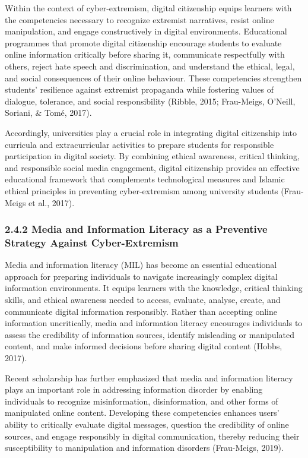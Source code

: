 \documentclass[10pt]{NSP1}
\begin{document}
	Within the context of cyber-extremism, digital citizenship equips learners with the competencies necessary to recognize extremist narratives, resist online manipulation, and engage constructively in digital environments. Educational programmes that promote digital citizenship encourage students to evaluate online information critically before sharing it, communicate respectfully with others, reject hate speech and discrimination, and understand the ethical, legal, and social consequences of their online behaviour. These competencies strengthen students' resilience against extremist propaganda while fostering values of dialogue, tolerance, and social responsibility (Ribble, 2015; Frau-Meigs, O'Neill, Soriani, \& Tom\'e, 2017).
	
	Accordingly, universities play a crucial role in integrating digital citizenship into curricula and extracurricular activities to prepare students for responsible participation in digital society. By combining ethical awareness, critical thinking, and responsible social media engagement, digital citizenship provides an effective educational framework that complements technological measures and Islamic ethical principles in preventing cyber-extremism among university students (Frau-Meigs et al., 2017).
	
	\subsubsection*{2.4.2 Media and Information Literacy as a Preventive Strategy Against Cyber-Extremism}
	
	Media and information literacy (MIL) has become an essential educational approach for preparing individuals to navigate increasingly complex digital information environments. It equips learners with the knowledge, critical thinking skills, and ethical awareness needed to access, evaluate, analyse, create, and communicate digital information responsibly. Rather than accepting online information uncritically, media and information literacy encourages individuals to assess the credibility of information sources, identify misleading or manipulated content, and make informed decisions before sharing digital content (Hobbs, 2017).
	
	Recent scholarship has further emphasized that media and information literacy plays an important role in addressing information disorder by enabling individuals to recognize misinformation, disinformation, and other forms of manipulated online content. Developing these competencies enhances users' ability to critically evaluate digital messages, question the credibility of online sources, and engage responsibly in digital communication, thereby reducing their susceptibility to manipulation and information disorders (Frau-Meigs, 2019).
	
\end{document}
